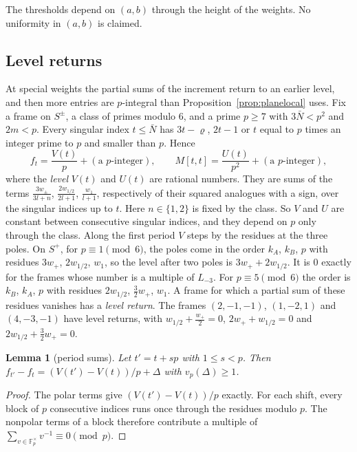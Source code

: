 \documentclass[11pt]{amsart}
\newtheorem{lemma}[theorem]{Lemma}
\theoremstyle{definition}
\theoremstyle{remark}
\numberwithin{equation}{section}
\newcommand{\F}{\mathbb F}
\newcommand{\Lt}{L_{-3}}             %
\begin{document}
The thresholds depend on $(a,b)$ through the height of the weights. No uniformity in $(a,b)$ is claimed.

\subsection{Level returns}\label{ssec:levels}
At special weights the partial sums of the increment return to an earlier level, and then more entries are
$p$-integral than Proposition~\ref{prop:planelocal} uses. Fix a frame on $S^\pm$, a class of primes modulo $6$, and a prime
$p\ge7$ with $3\bar N<p^2$ and $2m<p$. Every singular index $t\le\bar N$ has $3t-\varrho$, $2t-1$ or $t$ equal to $p$ times an
integer prime to $p$ and smaller than $p$. Hence
\[
 f_t=\frac{V(t)}p+(\text{a $p$-integer}),\qquad M[t,t]=\frac{U(t)}{p^2}+(\text{a $p$-integer}),
\]
where the \emph{level} $V(t)$ and $U(t)$ are rational numbers. They are sums of the terms
$\frac{3w_\pm}{3l+n}$, $\frac{2w_{1/2}}{2l+1}$, $\frac{w_1}{l+1}$, respectively of their squared analogues with a
sign, over the singular indices up to $t$. Here $n\in\{1,2\}$ is fixed by the class. So $V$ and $U$ are
constant between consecutive singular indices, and they depend on $p$ only through the class. Along the first period
$V$ steps by the residues at the three poles. On $S^+$, for $p\equiv1\pmod6$, the poles come in the order $k_A$, $k_B$,
$p$ with residues $3w_+$, $2w_{1/2}$, $w_1$, so the level after two poles is $3w_++2w_{1/2}$. It is $0$ exactly for the
frames whose number is a multiple of $\Lt$. For $p\equiv5\pmod6$ the order is $k_B$, $k_A$, $p$ with residues
$2w_{1/2}$, $\frac32w_+$, $w_1$. A frame for which a partial sum of these residues vanishes has a \emph{level return}.
The frames $(2,-1,-1)$, $(1,-2,1)$ and $(4,-3,-1)$ have level returns, with $w_{1/2}+\frac{w_+}2=0$,
$2w_++w_{1/2}=0$ and $2w_{1/2}+\frac32w_+=0$.

\begin{lemma}[period sums]\label{lem:periodsums}
Let $t'=t+sp$ with $1\le s<p$. Then $f_{t'}-f_t=(V(t')-V(t))/p+\Delta$ with $v_p(\Delta)\ge1$.
\end{lemma}
\begin{proof}
The polar terms give $(V(t')-V(t))/p$ exactly. For each shift, every block of $p$ consecutive indices runs once
through the residues modulo $p$. The nonpolar terms of a block therefore contribute a multiple of
$\sum_{v\in\F_p^\times}v^{-1}\equiv0\pmod p$.
\end{proof}
\end{document}
